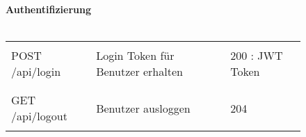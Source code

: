 \newpage

\begin{figure}[H]
	\textbf{Authentifizierung}\\ \\
	\begin{tabularx}{\textwidth}{X | X | X}
	\hline \\
	POST /api/login & Login Token für Benutzer erhalten & 200 : JWT Token \\ \\ \hline
	\\ GET /api/logout & Benutzer ausloggen & 204 \\ \\ \hline
	\end{tabularx}
\end{figure}






